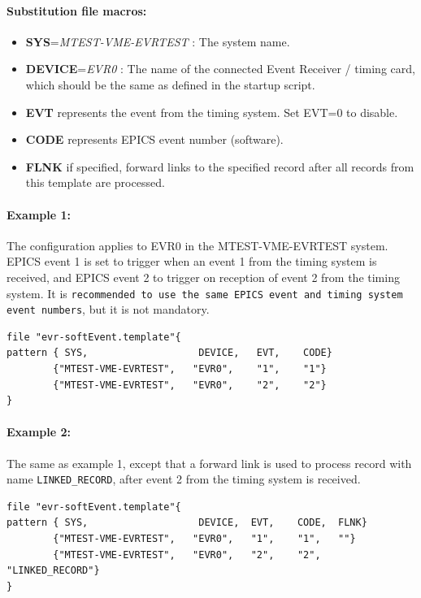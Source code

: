 \documentclass[12pt,a4paper]{article}
\begin{document}
\paragraph{Substitution file macros:}
\begin{itemize}
	\item
		\textbf{SYS}=\emph{MTEST-VME-EVRTEST} : The system name.
	\item
		\textbf{DEVICE}=\emph{EVR0} : The name of the connected Event Receiver / timing card, which should be the same as defined in the startup script. 
	\item
	  \textbf{EVT} represents the event from the timing system. Set EVT=0 to disable.
	\item
	  \textbf{CODE} represents EPICS event number (software).
	\item 
	  \textbf{FLNK} if specified, forward links to the specified record after all records from this template are processed.
\end{itemize}

\paragraph{Example 1:} The configuration applies to EVR0 in the MTEST-VME-EVRTEST system. EPICS event 1 is set to trigger when an event 1 from the timing system is received, and EPICS event 2 to trigger on reception of event 2 from the timing system. It is \texttt{recommended to use the same EPICS event and timing system event numbers}, but it is not mandatory.

\begin{verbatim}
file "evr-softEvent.template"{
pattern { SYS,                   DEVICE,   EVT,    CODE}
        {"MTEST-VME-EVRTEST",   "EVR0",    "1",    "1"}
        {"MTEST-VME-EVRTEST",   "EVR0",    "2",    "2"}
}
\end{verbatim}

\paragraph{Example 2:} The same as example 1, except that a forward link is used to process record with name \texttt{LINKED\_RECORD}, after event 2 from the timing system is received.

\begin{verbatim}
file "evr-softEvent.template"{
pattern { SYS,                   DEVICE,  EVT,    CODE,  FLNK}
        {"MTEST-VME-EVRTEST",   "EVR0",   "1",    "1",   ""}
        {"MTEST-VME-EVRTEST",   "EVR0",   "2",    "2",   "LINKED_RECORD"}
}
\end{verbatim}
\end{document}
